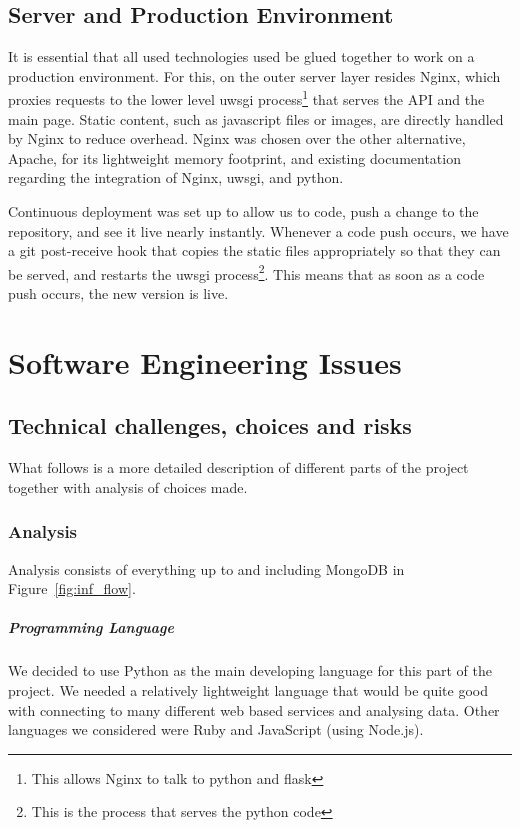 \documentclass{report}
\begin{document}
		\section{Server and Production Environment}

		It is essential that all used technologies used be glued together to work on a production environment. For this, on the outer server layer resides Nginx, which proxies requests to the lower level uwsgi process\footnote{This allows Nginx to talk to python and flask} that serves the API and the main page. Static content, such as javascript files or images, are directly handled by Nginx to reduce overhead. Nginx was chosen over the other alternative, Apache, for its lightweight memory footprint, and existing documentation regarding the integration of Nginx, uwsgi, and python.

		Continuous deployment was set up to allow us to code, push a change to the repository, and see it live nearly instantly. Whenever a code push occurs, we have a git post-receive hook that copies the static files appropriately so that they can be served, and restarts the uwsgi process\footnote{This is the process that serves the python code}. This means that as soon as a code push occurs, the new version is live.
		
		
	\chapter{Software Engineering Issues}
	
	\section{Technical challenges, choices and risks}
	What follows is a more detailed description of different parts of the project together with analysis of choices made.
	
	\subsection{Analysis}
		Analysis consists of everything up to and including MongoDB in Figure~\ref{fig:inf_flow}.
		
		\paragraph{Programming Language} We decided to use Python as the main developing language for this part of the project. We needed a relatively lightweight language that would be quite good with connecting to many different web based services and analysing data. Other languages we considered were Ruby and JavaScript (using Node.js).
		
\end{document}
